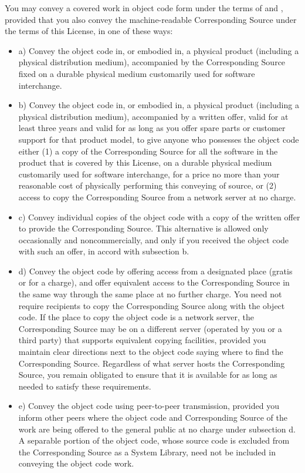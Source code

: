 \documentclass[10pt,english]{article}
\begin{document}
You may convey a covered work in object code form under the terms
of  and ,
provided that you also convey the machine-readable Corresponding Source
under the terms of this License, in one of these ways:
\begin{itemize}
\item a) Convey the object code in, or embodied in, a physical product (including
a physical distribution medium), accompanied by the Corresponding
Source fixed on a durable physical medium customarily used for software
interchange.
\item b) Convey the object code in, or embodied in, a physical product (including
a physical distribution medium), accompanied by a written offer, valid
for at least three years and valid for as long as you offer spare
parts or customer support for that product model, to give anyone who
possesses the object code either (1) a copy of the Corresponding Source
for all the software in the product that is covered by this License,
on a durable physical medium customarily used for software interchange,
for a price no more than your reasonable cost of physically performing
this conveying of source, or (2) access to copy the Corresponding
Source from a network server at no charge.
\item c) Convey individual copies of the object code with a copy of the
written offer to provide the Corresponding Source. This alternative
is allowed only occasionally and noncommercially, and only if you
received the object code with such an offer, in accord with 
subsection b.
\item d) Convey the object code by offering access from a designated place
(gratis or for a charge), and offer equivalent access to the Corresponding
Source in the same way through the same place at no further charge.
You need not require recipients to copy the Corresponding Source along
with the object code. If the place to copy the object code is a network
server, the Corresponding Source may be on a different server (operated
by you or a third party) that supports equivalent copying facilities,
provided you maintain clear directions next to the object code saying
where to find the Corresponding Source. Regardless of what server
hosts the Corresponding Source, you remain obligated to ensure that
it is available for as long as needed to satisfy these requirements.
\item e) Convey the object code using peer-to-peer transmission, provided
you inform other peers where the object code and Corresponding Source
of the work are being offered to the general public at no charge under
 subsection d. A separable
portion of the object code, whose source code is excluded from the
Corresponding Source as a System Library, need not be included in
conveying the object code work.
\end{itemize}
\end{document}
